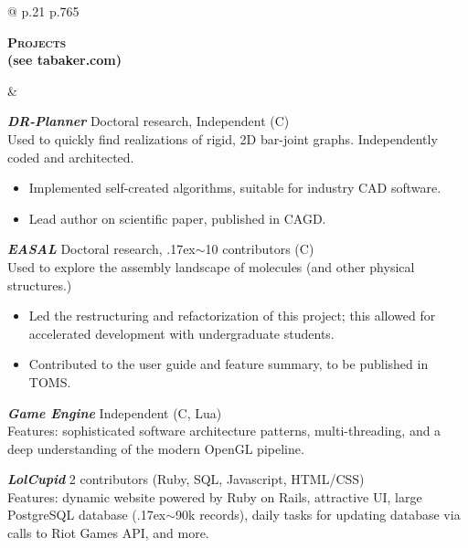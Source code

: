\documentclass[11pt]{article}
\def\mytilde{{\raise.17ex\hbox{$\scriptstyle\mathtt{\sim}$}}}
\def\cpp{{C\nolinebreak[4]\hspace{-.05em}\raisebox{.4ex}{\tiny\bf ++}}}
\newcommand{\titlecell}[1]{%
    \begin{minipage}[t]{\linewidth}
        \raggedleft \textbf{#1}
    \end{minipage}}
\newcommand{\contentcell}[1]{%
    \begin{minipage}[t]{\linewidth}
        #1
    \end{minipage}}
\newcommand{\tablerowskip}{\vspace{4.83mm} \\}
\newcommand{\projectskip}{\vspace{4.405mm}}
\newcommand{\contentcellheader}[1]{\textbf{\textsl{#1}}}
\begin{document}
\begin{tabular}{@{} p{.21\textwidth} p{.765\textwidth}}
    \titlecell{\textsc{Projects} \\ (see tabaker.com)} &
    \contentcell{
        \contentcellheader{DR-Planner} \hfill Doctoral research, Independent (\cpp)
        \\ Used to quickly find realizations of rigid, 2D bar-joint graphs. Independently coded and architected.
        \begin{itemize}[itemsep=0pt,topsep=0pt,leftmargin=*] \itemsep -2pt
            \item Implemented self-created algorithms, suitable for industry CAD software.
            \item Lead author on scientific paper, published in CAGD.
        \end{itemize}
        \projectskip

        \contentcellheader{EASAL} \hfill Doctoral research, \mytilde 10 contributors (\cpp)
        \\ Used to explore the assembly landscape of molecules (and other physical structures.)
        \begin{itemize}[itemsep=0pt,topsep=0pt,leftmargin=*] \itemsep -2pt
            \item Led the restructuring and refactorization of this project; this allowed for accelerated development with undergraduate students.
            \item Contributed to the user guide and feature summary, to be published in TOMS.
        \end{itemize}
        \projectskip

        \contentcellheader{Game Engine} \hfill Independent (\cpp, Lua)
        \\ Features: sophisticated software architecture patterns, multi-threading, and a deep understanding of the modern OpenGL
        pipeline.
        \projectskip

        \contentcellheader{LolCupid} \hfill 2 contributors (Ruby, SQL, Javascript, HTML/CSS)
        \\ Features: dynamic website powered by Ruby on Rails, attractive UI, large PostgreSQL database (\mytilde 90k records), daily tasks for updating database via calls to Riot Games API, and more.
    }
    \tablerowskip


\end{tabular}
\end{document}
